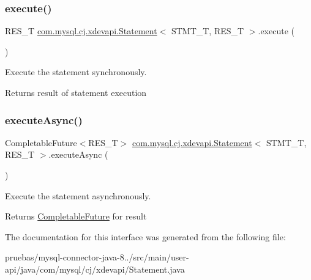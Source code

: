 \mbox{\label{interfacecom_1_1mysql_1_1cj_1_1xdevapi_1_1_statement_ae92dce50b119561fd532303ad491c610}} 
\subsubsection{\texorpdfstring{execute()}{execute()}}
{\footnotesize\ttfamily R\+E\+S\+\_\+T \mbox{\hyperlink{interfacecom_1_1mysql_1_1cj_1_1xdevapi_1_1_statement}{com.\+mysql.\+cj.\+xdevapi.\+Statement}}$<$ S\+T\+M\+T\+\_\+T, R\+E\+S\+\_\+T $>$.execute (\begin{DoxyParamCaption}{ }\end{DoxyParamCaption})}

Execute the statement synchronously.

\begin{DoxyReturn}{Returns}
result of statement execution 
\end{DoxyReturn}
\mbox{\label{interfacecom_1_1mysql_1_1cj_1_1xdevapi_1_1_statement_abb6aa6d3f4b3088af1a2f81a50eeab49}} 
\subsubsection{\texorpdfstring{execute\+Async()}{executeAsync()}}
{\footnotesize\ttfamily Completable\+Future$<$R\+E\+S\+\_\+T$>$ \mbox{\hyperlink{interfacecom_1_1mysql_1_1cj_1_1xdevapi_1_1_statement}{com.\+mysql.\+cj.\+xdevapi.\+Statement}}$<$ S\+T\+M\+T\+\_\+T, R\+E\+S\+\_\+T $>$.execute\+Async (\begin{DoxyParamCaption}{ }\end{DoxyParamCaption})}

Execute the statement asynchronously.

\begin{DoxyReturn}{Returns}
\mbox{\hyperlink{}{Completable\+Future}} for result 
\end{DoxyReturn}


The documentation for this interface was generated from the following file\+:\begin{DoxyCompactItemize}
\item 
pruebas/mysql-\/connector-\/java-\/8../src/main/user-\/api/java/com/mysql/cj/xdevapi/Statement.\+java\end{DoxyCompactItemize}
